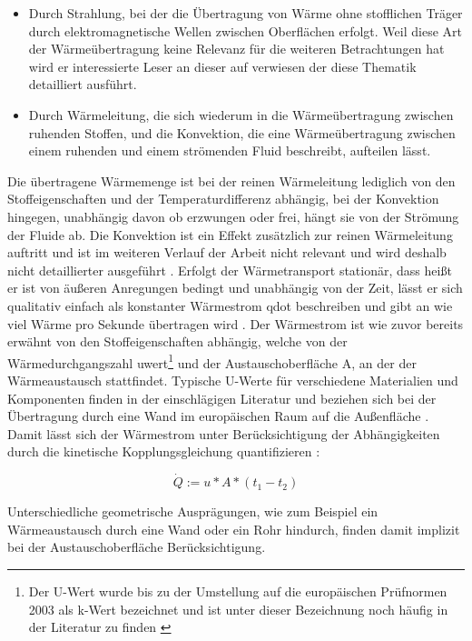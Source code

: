 \begin{itemize}
	\item Durch Strahlung, bei der die Übertragung von Wärme ohne stofflichen Träger durch elektromagnetische Wellen zwischen Oberflächen erfolgt. Weil diese Art der Wärmeübertragung keine Relevanz für die weiteren Betrachtungen hat wird er interessierte Leser an dieser auf \cite{bo14} verwiesen der diese Thematik detailliert ausführt. 
	\item  Durch Wärmeleitung, die sich wiederum in die Wärmeübertragung zwischen ruhenden Stoffen, und die Konvektion, die eine Wärmeübertragung zwischen einem ruhenden und einem strömenden Fluid beschreibt, aufteilen lässt. 
\end{itemize}

Die übertragene Wärmemenge ist bei der reinen Wärmeleitung lediglich von den Stoffeigenschaften und der Temperaturdifferenz abhängig, bei der Konvektion hingegen, unabhängig davon ob erzwungen oder frei, hängt sie von der Strömung der Fluide ab. Die Konvektion ist ein Effekt zusätzlich zur reinen Wärmeleitung auftritt und ist im weiteren Verlauf der Arbeit nicht relevant und wird deshalb nicht detaillierter ausgeführt \cite[S.~3f.]{bo14}.
Erfolgt der Wärmetransport stationär, dass heißt er ist von äußeren Anregungen bedingt und unabhängig von der Zeit, lässt er sich qualitativ einfach als konstanter Wärmestrom \gls{qdot} beschreiben und gibt an wie viel Wärme pro Sekunde übertragen wird \cite[S.~5ff.]{bo14}. Der Wärmestrom ist wie zuvor bereits erwähnt von den Stoffeigenschaften abhängig, welche von der Wärmedurchgangszahl \gls{uwert}\footnote{Der U-Wert wurde bis zu der Umstellung auf die europäischen Prüfnormen 2003 als k-Wert bezeichnet und ist unter dieser Bezeichnung noch häufig in der Literatur zu finden \cite[S.1~f.]{sa04}} und der Austauschoberfläche \gls{A}, an der der Wärmeaustausch stattfindet. Typische U-Werte für verschiedene Materialien und Komponenten finden in der einschlägigen Literatur und beziehen sich bei der Übertragung durch eine Wand im europäischen Raum auf die Außenfläche \cite[S.~28]{bo14}. Damit lässt sich der Wärmestrom unter Berücksichtigung der Abhängigkeiten durch die kinetische Kopplungsgleichung quantifizieren \cite[S.~6f.]{bo14}:

\begin{equation}
\label{eq:qdot}
\dot{Q} := u*A*(t_{1}-t_{2})
\end{equation}

Unterschiedliche geometrische Ausprägungen, wie zum Beispiel ein Wärmeaustausch durch eine Wand oder ein Rohr hindurch, finden damit implizit bei der Austauschoberfläche Berücksichtigung.

